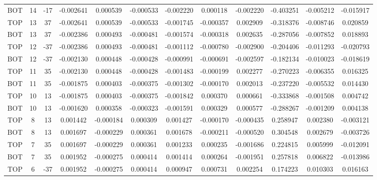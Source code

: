 \begin{landscape}
\begin{table}
\begin{tabular}{|ccc|ccc|ccc|ccc|}
BOT &   14 &    -17 & -0.002641 &  0.000539 & -0.000533 & -0.002220 &  0.000118 & -0.002220 &      -0.403251 &      -0.005212 &      -0.015917 \\
TOP &   13 &     37 & -0.002641 &  0.000539 & -0.000533 & -0.001745 & -0.000357 &  0.002909 &      -0.318376 &      -0.008746 &       0.020859 \\
BOT &   13 &     37 & -0.002386 &  0.000493 & -0.000481 & -0.001574 & -0.000318 &  0.002635 &      -0.287056 &      -0.007852 &       0.018893 \\
TOP &   12 &    -37 & -0.002386 &  0.000493 & -0.000481 & -0.001112 & -0.000780 & -0.002900 &      -0.204406 &      -0.011293 &      -0.020793 \\
BOT &   12 &    -37 & -0.002130 &  0.000448 & -0.000428 & -0.000991 & -0.000691 & -0.002597 &      -0.182134 &      -0.010023 &      -0.018619 \\
TOP &   11 &     35 & -0.002130 &  0.000448 & -0.000428 & -0.001483 & -0.000199 &  0.002277 &      -0.270223 &      -0.006355 &       0.016325 \\
BOT &   11 &     35 & -0.001875 &  0.000403 & -0.000375 & -0.001302 & -0.000170 &  0.002013 &      -0.237220 &      -0.005532 &       0.014430 \\
TOP &   10 &     13 & -0.001875 &  0.000403 & -0.000375 & -0.001842 &  0.000370 &  0.000661 &      -0.333868 &      -0.001508 &       0.004742 \\
BOT &   10 &     13 & -0.001620 &  0.000358 & -0.000323 & -0.001591 &  0.000329 &  0.000577 &      -0.288267 &      -0.001209 &       0.004138 \\
TOP &    8 &     13 &  0.001442 & -0.000184 &  0.000309 &  0.001427 & -0.000170 & -0.000435 &       0.258947 &       0.002380 &      -0.003121 \\
BOT &    8 &     13 &  0.001697 & -0.000229 &  0.000361 &  0.001678 & -0.000211 & -0.000520 &       0.304548 &       0.002679 &      -0.003726 \\
TOP &    7 &     35 &  0.001697 & -0.000229 &  0.000361 &  0.001233 &  0.000235 & -0.001686 &       0.224815 &       0.005999 &      -0.012091 \\
BOT &    7 &     35 &  0.001952 & -0.000275 &  0.000414 &  0.001414 &  0.000264 & -0.001951 &       0.257818 &       0.006822 &      -0.013986 \\
TOP &    6 &    -37 &  0.001952 & -0.000275 &  0.000414 &  0.000947 &  0.000731 &  0.002254 &       0.174223 &       0.010303 &       0.016163 \\

\end{tabular}
\end{table}
\end{landscape}
